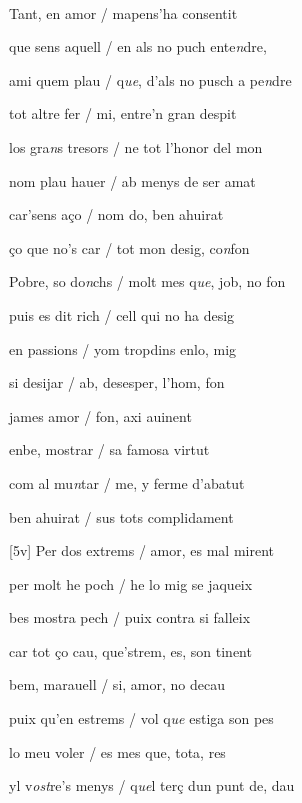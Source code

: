 \documentclass[12pt]{article}
\renewcommand{\espaiAbansEtiquetaPoema}{\vspace{0ex}}
\begin{document}
\begin{estrofa}

\espaiAbansEtiquetaPoema

\\

\end{estrofa}


\begin{estrofa}

 Tant, en amor / mapens'ha consentit

 que sens aquell / en als no puch ente\textit{n}dre,

 ami quem plau / q\textit{ue}, d'als no pusch a pe\textit{n}dre

 tot altre fer / mi, entre'n gran despit

 los gra\textit{n}s tresors / ne tot l'honor del mon

 nom plau hauer / ab menys de ser amat

 car'sens a\c{c}o / nom do, ben ahuirat \cite{ref11}

 \c{c}o que no's car / tot mon desig, co\textit{n}fon

\end{estrofa}



\begin{estrofa}

 Pobre, so do\textit{n}chs / molt mes q\textit{ue}, job, no fon

 puis es dit rich / cell qui no ha desig

 en passions / yom tropdins enlo, mig

 si desijar / ab, desesper, l'hom, fon

 james amor / fon, axi auinent

 enbe, mostrar / sa famosa virtut

 com al mu\textit{n}tar / me, y ferme d'abatut

 ben ahuirat / sus tots complidament

\end{estrofa}



\begin{estrofa}

 [5v] Per dos extrems / amor, es mal mirent

 per molt he poch / he lo mig se jaqueix

 bes mostra pech / puix contra si falleix

 car tot \c{c}o cau, que'strem, es, son tinent

 bem, marauell / si, amor, no decau

 puix qu'en estrems / vol q\textit{ue} estiga son pes

 lo meu voler / es mes que, tota, res

 yl v\textit{ost}re's menys / q\textit{ue}l ter\c{c} dun punt de, dau

\end{estrofa}
\end{document}
